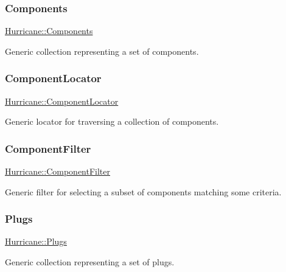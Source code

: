 \subsubsection{\texorpdfstring{Components}{Components}}
{\footnotesize\ttfamily \mbox{\hyperlink{namespaceHurricane_a7d26d99aeb5dd6d70d51bd35d2473e72}{Hurricane\+::\+Components}}}

Generic collection representing a set of components. \mbox{\label{namespaceHurricane_ad72b1998a4ff6e68326469dec9887f4d}} 
\subsubsection{\texorpdfstring{Component\+Locator}{ComponentLocator}}
{\footnotesize\ttfamily \mbox{\hyperlink{namespaceHurricane_ad72b1998a4ff6e68326469dec9887f4d}{Hurricane\+::\+Component\+Locator}}}

Generic locator for traversing a collection of components. \mbox{\label{namespaceHurricane_acbfacb3aada84aa054e587817f204e90}} 
\subsubsection{\texorpdfstring{Component\+Filter}{ComponentFilter}}
{\footnotesize\ttfamily \mbox{\hyperlink{namespaceHurricane_acbfacb3aada84aa054e587817f204e90}{Hurricane\+::\+Component\+Filter}}}

Generic filter for selecting a subset of components matching some criteria. \mbox{\label{namespaceHurricane_ac8335d2057483ee7a935c15a9460c64f}} 
\subsubsection{\texorpdfstring{Plugs}{Plugs}}
{\footnotesize\ttfamily \mbox{\hyperlink{namespaceHurricane_ac8335d2057483ee7a935c15a9460c64f}{Hurricane\+::\+Plugs}}}

Generic collection representing a set of plugs. \mbox{\label{namespaceHurricane_a99a5e89f593de242e24a24b632b0534e}} 
